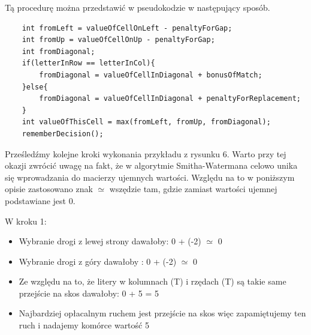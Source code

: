 \documentclass[a4paper,12pt]{article}
\newenvironment{lista}{
\begin{itemize}
  \setlength{\itemsep}{1pt}
  \setlength{\parskip}{0pt}
  \setlength{\parsep}{0pt}
}{\end{itemize}}
\begin{document}
Tą procedurę można przedstawić w pseudokodzie w następujący sposób. 

\begin{lstlisting}
	int fromLeft = valueOfCellOnLeft - penaltyForGap;
	int fromUp = valueOfCellOnUp - penaltyForGap;
	int fromDiagonal;
	if(letterInRow == letterInCol){
		fromDiagonal = valueOfCellInDiagonal + bonusOfMatch;
	}else{
		fromDiagonal = valueOfCellInDiagonal + penaltyForReplacement;
	}
	int	valueOfThisCell = max(fromLeft, fromUp, fromDiagonal);
	rememberDecision();
\end{lstlisting}

Prześledźmy kolejne kroki wykonania przykładu z rysunku 6. Warto przy tej okazji zwrócić uwagę na fakt, że w algorytmie Smitha-Watermana celowo unika się wprowadzania do macierzy ujemnych wartości. Względu na to w poniższym opisie zastosowano znak $\simeq$ wszędzie tam, gdzie zamiast wartości ujemnej podstawiane jest 0.

W kroku 1:
\begin{lista}
\item Wybranie drogi z lewej strony dawałoby: 0 + (-2) $\simeq$ 0
\item Wybranie drogi z góry dawałoby : 0 + (-2) $\simeq$ 0
\item Ze względu na to, że litery w kolumnach (T) i rzędach (T) są takie same przejście na skos dawałoby: 0 + 5 = 5
\item Najbardziej opłacalnym ruchem jest przejście na skos więc zapamiętujemy ten ruch i nadajemy komórce wartość 5
\end{lista}
\end{document}
